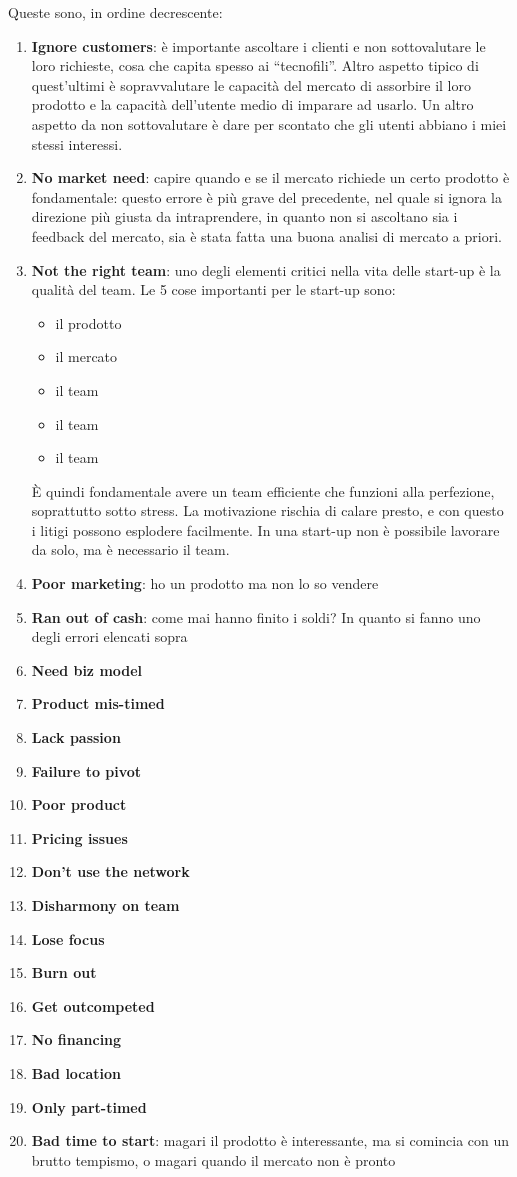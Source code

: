 Queste sono, in ordine decrescente:
\begin{enumerate}
 \item \textbf{Ignore customers}: è importante ascoltare i clienti e non
 sottovalutare le loro richieste, cosa che capita spesso ai ``tecnofili''.
 Altro aspetto tipico di quest'ultimi è sopravvalutare le capacità del mercato
 di assorbire il loro prodotto e la capacità dell'utente medio di imparare ad
 usarlo. Un altro aspetto da non sottovalutare è dare per scontato che gli
 utenti abbiano i miei stessi interessi.
 \item \textbf{No market need}: capire quando e se il mercato richiede un certo
 prodotto è fondamentale: questo errore è più grave del precedente, nel quale
 si ignora la direzione più giusta da intraprendere, in quanto non si ascoltano
 sia i feedback del mercato, sia è stata fatta una buona analisi di mercato a
 priori.
 \item \textbf{Not the right team}: uno degli elementi critici nella vita delle
start-up è la qualità del team. Le 5 cose importanti per le start-up sono:
\begin{itemize}
 \item il prodotto
 \item il mercato
 \item il team
 \item il team
 \item il team
\end{itemize}
  È quindi fondamentale avere un team efficiente che funzioni alla perfezione,
soprattutto sotto stress. La motivazione rischia di calare presto, e con questo
i litigi possono esplodere facilmente. In una start-up non è possibile lavorare
da solo, ma è necessario il team.
 \item \textbf{Poor marketing}: ho un prodotto ma non lo so vendere
 \item \textbf{Ran out of cash}: come mai hanno finito i soldi? In quanto si
 fanno uno degli errori elencati sopra
 \item \textbf{Need biz model}
 \item \textbf{Product mis-timed}
 \item \textbf{Lack passion}
 \item \textbf{Failure to pivot}
 \item \textbf{Poor product}
 \item \textbf{Pricing issues}
 \item \textbf{Don't use the network}
 \item \textbf{Disharmony on team}
 \item \textbf{Lose focus}
 \item \textbf{Burn out}
 \item \textbf{Get outcompeted}
 \item \textbf{No financing}
 \item \textbf{Bad location}
 \item \textbf{Only part-timed}
 \item \textbf{Bad time to start}: magari il prodotto è interessante, ma si
 comincia con un brutto tempismo, o magari quando il mercato non è pronto
\end{enumerate}


